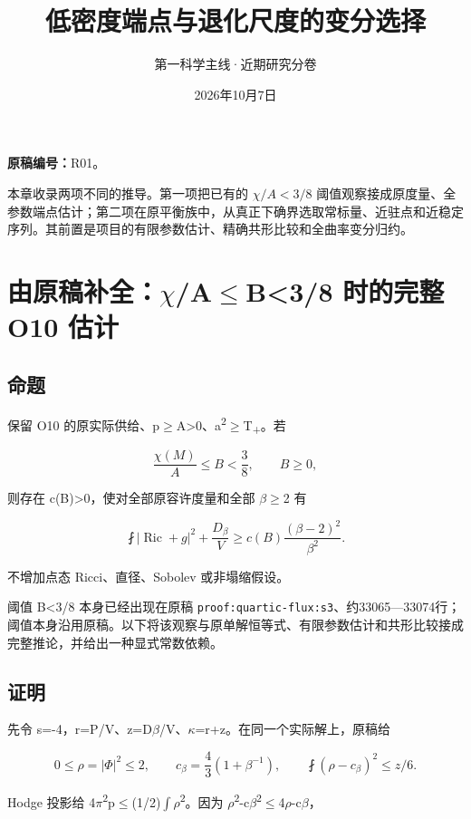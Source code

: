 \documentclass[UTF8,11pt,fontset=none]{ctexart}
\title{低密度端点与退化尺度的变分选择}
\author{第一科学主线·近期研究分卷}
\date{2026年10月7日}
\begin{document}
\maketitle
\noindent\textbf{原稿编号：}R01。

本章收录两项不同的推导。第一项把已有的 \(\chi/A<3/8\) 阈值观察接成原度量、全参数端点估计；第二项在原平衡族中，从真正下确界选取常标量、近驻点和近稳定序列。其前置是项目的有限参数估计、精确共形比较和全曲率变分归约。\cite{R01,Base,N1}

\section{由原稿补全：\(\chi\)/A\(\le\)B\textless3/8 时的完整 O10 估计}\label{ch1:ux7531ux539fux7a3fux8865ux5168ux3c7ab38-ux65f6ux7684ux5b8cux6574-o10-ux4f30ux8ba1}

\subsection{命题}\label{ch1:ux547dux9898}

保留 O10 的原实际供给、p\(\ge\)A\textgreater0、a\textsuperscript{2}\(\ge\)T\textsubscript{+}。若

\[
\frac{\chi(M)}A\le B<\frac38,\qquad B\ge0,
\]

则存在 c(B)\textgreater0，使对全部原容许度量和全部 \(\beta\)\(\ge\)2 有

\[
\boxed{\fint|\operatorname{Ric}+g|^2+\frac{D_\beta}{V}
\ge c(B)\frac{(\beta-2)^2}{\beta^2}.}
\tag{1.1}\label{eq:r1:1}
\]

不增加点态 Ricci、直径、Sobolev 或非塌缩假设。

阈值 B\textless3/8 本身已经出现在原稿 \texttt{proof:quartic-flux:s3}、约33065---33074行；阈值本身沿用原稿。以下将该观察与原单解恒等式、有限参数估计和共形比较接成完整推论，并给出一种显式常数依赖。

\subsection{证明}\label{ch1:ux8bc1ux660e}

先令 s=-4，r=P/V、z=D\(\beta\)/V、\(\kappa\)=r+z。在同一个实际解上，原稿给

\[
0\le\rho=|\Phi|^2\le2,\qquad
c_\beta=\frac43(1+\beta^{-1}),\qquad
\fint(\rho-c_\beta)^2\le z/6.
\]

Hodge 投影给 4\(\pi\)\textsuperscript{2}p\(\le\)(1/2)\(\int\)\(\rho\)\textsuperscript{2}。因为 \textbar \(\rho\)\textsuperscript{2}-c\(\beta\)\textsuperscript{2}\textbar\(\le\)4\textbar \(\rho\)-c\(\beta\)\textbar，
\end{document}
